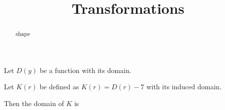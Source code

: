 \documentclass{ximera}
\title{Transformations}
\begin{document}
\begin{abstract}
shape
\end{abstract}
\maketitle











Let $D(y)$ be a function with its domain.

Let $K(r)$ be defined as $K(r) = D(r)-7$ with its induced domain.


Then the domain of $K$ is

\begin{multipleChoice}
\end{multipleChoice}
\end{document}
